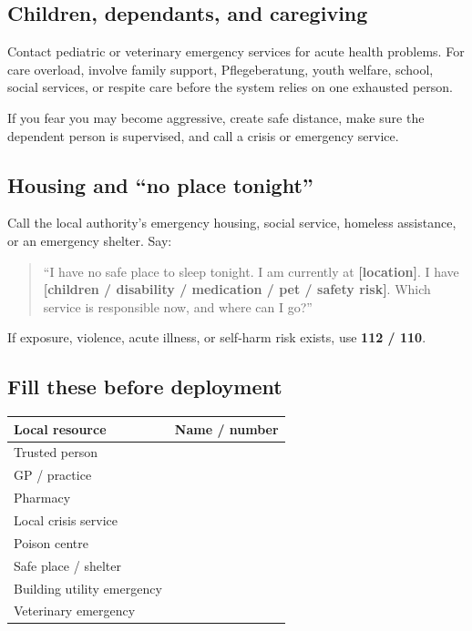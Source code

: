 \hypertarget{children-dependants-and-caregiving}{%
\subsection{Children, dependants, and
caregiving}\label{children-dependants-and-caregiving}}

Contact pediatric or veterinary emergency services for acute health
problems. For care overload, involve family support, Pflegeberatung,
youth welfare, school, social services, or respite care before the
system relies on one exhausted person.

If you fear you may become aggressive, create safe distance, make sure
the dependent person is supervised, and call a crisis or emergency
service.

\hypertarget{housing-and-no-place-tonight}{%
\subsection{Housing and ``no place
tonight''}\label{housing-and-no-place-tonight}}

Call the local authority's emergency housing, social service, homeless
assistance, or an emergency shelter. Say:

\begin{quote}
``I have no safe place to sleep tonight. I am currently at
\textbf{{[}location{]}}. I have \textbf{{[}children / disability /
medication / pet / safety risk{]}}. Which service is responsible now,
and where can I go?''
\end{quote}

If exposure, violence, acute illness, or self-harm risk exists, use
\textbf{112 / 110}.

\hypertarget{fill-these-before-deployment}{%
\subsection{Fill these before
deployment}\label{fill-these-before-deployment}}

\begin{longtable}[]{@{}ll@{}}
\toprule\noalign{}
Local resource & Name / number \\
\midrule\noalign{}
\endhead
\bottomrule\noalign{}
\endlastfoot
Trusted person & \\
GP / practice & \\
Pharmacy & \\
Local crisis service & \\
Poison centre & \\
Safe place / shelter & \\
Building utility emergency & \\
Veterinary emergency & \\
\end{longtable}

